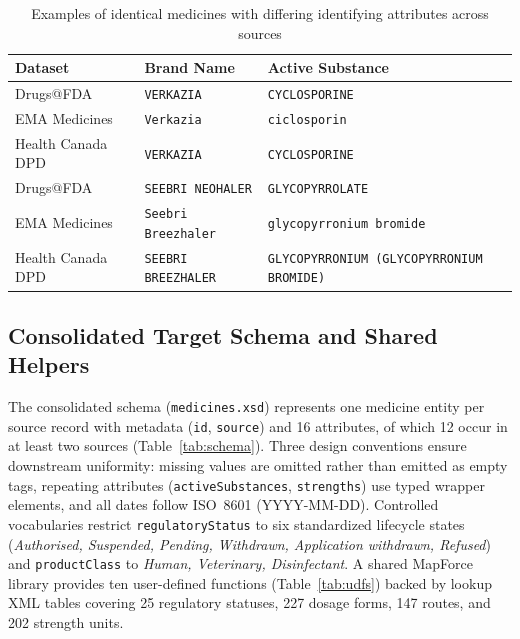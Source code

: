 \documentclass{llncs}
\begin{document}
\begin{table}[htbp]
\centering
\caption{Examples of identical medicines with differing identifying attributes across sources}
\label{tab:difficult_match}
\scriptsize
\setlength{\tabcolsep}{3pt}
\begin{tabularx}{\textwidth}{|l|l|>{\raggedright\arraybackslash}X|}
\hline
\textbf{Dataset} & \textbf{Brand Name} & \textbf{Active Substance} \\
\hline
Drugs@FDA         & \texttt{VERKAZIA}          & \texttt{CYCLOSPORINE} \\
EMA Medicines     & \texttt{Verkazia}          & \texttt{ciclosporin} \\
Health Canada DPD & \texttt{VERKAZIA}          & \texttt{CYCLOSPORINE} \\
\hline
Drugs@FDA         & \texttt{SEEBRI NEOHALER}   & \texttt{GLYCOPYRROLATE} \\
EMA Medicines     & \texttt{Seebri Breezhaler} & \texttt{glycopyrronium bromide} \\
Health Canada DPD & \texttt{SEEBRI BREEZHALER} & \texttt{GLYCOPYRRONIUM (GLYCOPYRRONIUM BROMIDE)} \\
\hline
\end{tabularx}
\end{table}

\subsection{Consolidated Target Schema and Shared Helpers}

The consolidated schema (\texttt{medicines.xsd}) represents one medicine entity per source record with metadata (\texttt{id}, \texttt{source}) and 16 attributes, of which 12 occur in at least two sources (Table~\ref{tab:schema}). Three design conventions ensure downstream uniformity: missing values are omitted rather than emitted as empty tags, repeating attributes (\texttt{activeSubstances}, \texttt{strengths}) use typed wrapper elements, and all dates follow ISO~8601 (YYYY-MM-DD). Controlled vocabularies restrict \texttt{regulatoryStatus} to six standardized lifecycle states (\textit{Authorised, Suspended, Pending, Withdrawn, Application withdrawn, Refused}) and \texttt{productClass} to \textit{Human, Veterinary, Disinfectant}. A shared MapForce library provides ten user-defined functions (Table~\ref{tab:udfs}) backed by lookup XML tables covering 25 regulatory statuses, 227 dosage forms, 147 routes, and 202 strength units.
\end{document}
